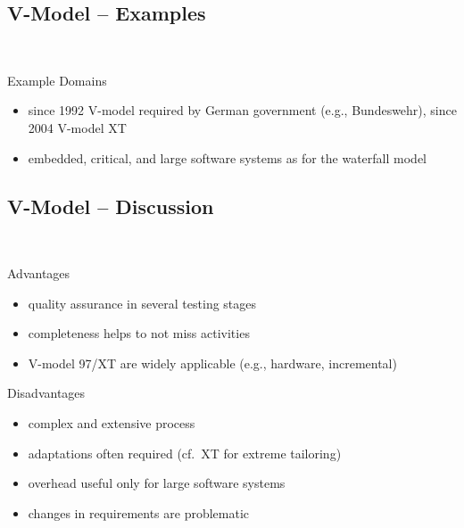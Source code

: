 \subsection{V-Model -- Examples}
\begin{frame}{\insertsubsection\ \mytitlesource{\ludewiglichter}}
	\begin{fancycolumns}[animation=none]
		\begin{example}{Example Domains}
			\begin{itemize}
				\item since 1992 V-model required by German government (e.g., Bundeswehr), since 2004 V-model XT
				\item embedded, critical, and large software systems as for the waterfall model
			\end{itemize}
		\end{example}
		\nextcolumn
	\end{fancycolumns}
\end{frame}

\subsection{V-Model -- Discussion}
\begin{frame}{\insertsubsection\ \mytitlesource{\ludewiglichter}}
	\begin{fancycolumns}
		\begin{note}{Advantages}
			\begin{itemize}
				\item quality assurance in several testing stages
				\item completeness helps to not miss activities
				\item V-model 97/XT are widely applicable (e.g., hardware, incremental)
			\end{itemize}
		\end{note}
		\nextcolumn
		\begin{note}{Disadvantages}
				\begin{itemize}
					\item complex and extensive process
					\item adaptations often required (cf.\ XT for extreme tailoring)
					\item overhead useful only for large software systems
					\item changes in requirements are problematic
				\end{itemize}
		\end{note}
	\end{fancycolumns}
\end{frame}


